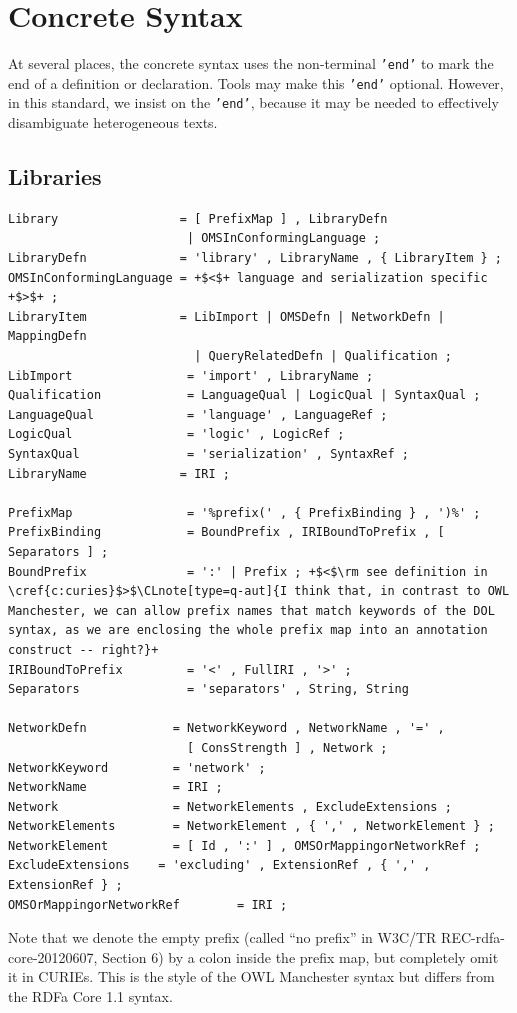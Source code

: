 \documentclass[10pt,%
\ifpretendfinal
final%
\else
draft%
\fi,
]{scrreprt}
\makeatletter
\newcommand*\CommentAuthor{}
\renewcommand*\CommentAuthor{#1}}
\newcommand*\CommentDate{}
\renewcommand*\CommentDate{#1}}
\newcommand*\CommentId{}
\renewcommand*\CommentId{#1}}
\newcommand*\CommentType{}
\renewcommand*\CommentType{#1}}
\newcommand*{\SetCommentColorByType}[1]{%
\edef\localType{{#1}}%
\expandafter\ifstrequal\localType{q-aut}{\colorlet{CommentColor}{red}}{%
\expandafter\ifstrequal\localType{q-all}{\colorlet{CommentColor}{orange}}{%
\expandafter\ifstrequal\localType{todo}{\colorlet{CommentColor}{orange}}{%
\expandafter\ifstrequal\localType{fyi}{\colorlet{CommentColor}{lightgray}}{%
\colorlet{CommentColor}{yellow}}}}}}
\newcommand*{\SetCommentPrefixByType}[1]{%
\edef\localType{{#1}}%
\expandafter\@ifmtarg\localType{%
\edef\CommentPrefix{}%
}{%
\caseupper[q]{#1}%
\edef\CommentPrefix{\thestring: }%
}}
\newcommand*{\initComment}[1]{%
\setkeys{Comment}{#1}%
\SetCommentColorByType{\CommentType}%
\relax%
\SetCommentPrefixByType{\CommentType}%
\relax%
}
\newcommand*{\todonote}[2][]{%
\initComment{#1}%
\pdfcomment[author=\CommentAuthor,color=CommentColor,date=\CommentDate,id=\CommentId]{%
\CommentPrefix
#2}}
\renewcommand*{\todonote}[2][]{%
\initComment{#1}%
\ednote{\CommentPrefix #2}}
\newcommand*{\CLnote}[2][author=Christoph Lange]{%
\todonote[author=Christoph Lange,#1]{#2} 
}
\newcommand*{\syntax}[1]{\texttt{#1}}
\newcommand{\clauserefname}{clause}
\newcommand{\cref}[1]{\clauserefname~\ref{#1}}
\newcommand{\sclause}[1]{\section{#1}}
\newcommand{\ssclause}[1]{\subsection{#1}}
\newcommand{\nisref}[1]{#1}
\makeatother
\begin{document}
\sclause{Concrete Syntax}\label{a:dol-text:concrete}

At several places, the concrete syntax uses the non-terminal
\syntax{'end'} to mark the end of a definition or declaration. Tools
may make this \syntax{'end'} optional. However, in this standard,
we insist on the \syntax{'end'}, because it may be needed to effectively
disambiguate heterogeneous texts.
 
\ssclause{Libraries}

\begin{lstlisting}[language=ebnf,escapechar=+,morecomment={[l]{\%\%\ }}]
Library                 = [ PrefixMap ] , LibraryDefn
                         | OMSInConformingLanguage ;
LibraryDefn             = 'library' , LibraryName , { LibraryItem } ;
OMSInConformingLanguage = +$<$+ language and serialization specific +$>$+ ;
LibraryItem             = LibImport | OMSDefn | NetworkDefn | MappingDefn 
                          | QueryRelatedDefn | Qualification ;
LibImport                = 'import' , LibraryName ;
Qualification            = LanguageQual | LogicQual | SyntaxQual ;
LanguageQual             = 'language' , LanguageRef ;
LogicQual                = 'logic' , LogicRef ;
SyntaxQual               = 'serialization' , SyntaxRef ;
LibraryName             = IRI ;

PrefixMap                = '%prefix(' , { PrefixBinding } , ')%' ;
PrefixBinding            = BoundPrefix , IRIBoundToPrefix , [ Separators ] ;
BoundPrefix              = ':' | Prefix ; +$<$\rm see definition in \cref{c:curies}$>$\CLnote[type=q-aut]{I think that, in contrast to OWL Manchester, we can allow prefix names that match keywords of the DOL syntax, as we are enclosing the whole prefix map into an annotation construct -- right?}+ 
IRIBoundToPrefix         = '<' , FullIRI , '>' ;
Separators               = 'separators' , String, String 

NetworkDefn            = NetworkKeyword , NetworkName , '=' , 
                         [ ConsStrength ] , Network ;
NetworkKeyword         = 'network' ;
NetworkName            = IRI ;
Network                = NetworkElements , ExcludeExtensions ;
NetworkElements        = NetworkElement , { ',' , NetworkElement } ;
NetworkElement         = [ Id , ':' ] , OMSOrMappingorNetworkRef ;
ExcludeExtensions    = 'excluding' , ExtensionRef , { ',' , ExtensionRef } ;
OMSOrMappingorNetworkRef        = IRI ;
\end{lstlisting}

Note that we denote the empty prefix (called ``no prefix'' in \nisref{W3C/TR REC-rdfa-core-20120607, Section 6}) by a colon inside the prefix map, but completely omit it in CURIEs.  This is the style of the OWL Manchester syntax \cite{W3C:NOTE-owl2-manchester-syntax-20091027} but differs from the RDFa Core 1.1 syntax.
\end{document}
